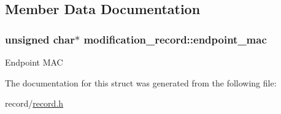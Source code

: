\subsection{Member Data Documentation}
\hypertarget{structmodification__record_ae7ca1e3ae138fb7df726b00c2c7c0b7c}{
\subsubsection[{endpoint\-\_\-mac}]{\setlength{\rightskip}{0pt plus 5cm}unsigned char$\ast$ modification\-\_\-record\-::endpoint\-\_\-mac}}\label{structmodification__record_ae7ca1e3ae138fb7df726b00c2c7c0b7c}
Endpoint M\-A\-C 

The documentation for this struct was generated from the following file\-:\begin{DoxyCompactItemize}
\item 
record/\hyperlink{record_8h}{record.\-h}\end{DoxyCompactItemize}
